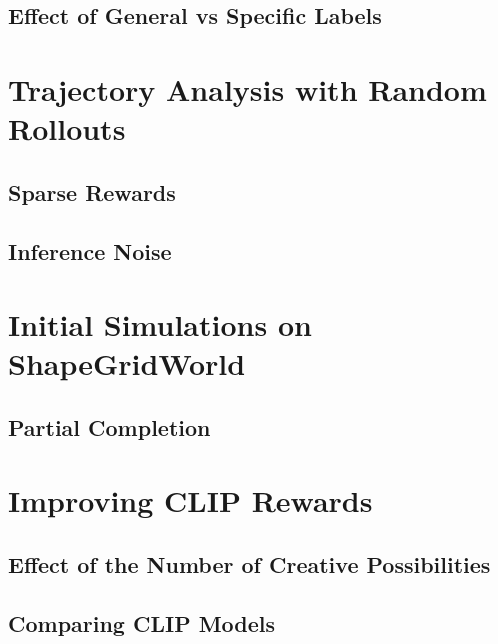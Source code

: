 \subsection{Effect of General vs Specific Labels}
\label{sec:clip-labels}



\section{Trajectory Analysis with Random Rollouts}
\label{sec:random-rollouts}


\subsection{Sparse Rewards} %
\label{sec:sparse-rewards}


\subsection{Inference Noise} %
\label{sec:inference-noise}



\section{Initial Simulations on ShapeGridWorld}
\label{sec:sgw-simulations}

\subsection{Partial Completion}
\label{sec:partial-completion}



\section{Improving CLIP Rewards}
\label{sec:improving-rewards}

\subsection{Effect of the Number of Creative Possibilities}
\label{sec:clip-categories}


\subsection{Comparing CLIP Models}
\label{sec:clip-comparison}


